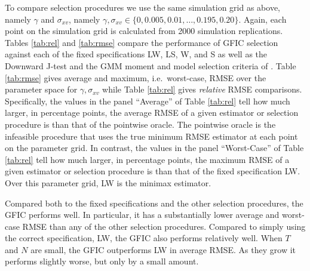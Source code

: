 To compare selection procedures we use the same simulation grid as above, namely $\gamma$ and $\sigma_{xv}$, namely $\gamma, \sigma_{xv} \in \{0, 0.005, 0.01, \hdots, 0.195, 0.20\}$.  
Again, each point on the simulation grid is calculated from 2000 simulation replications. 
Tables \ref{tab:rel} and \ref{tab:rmse} compare the performance of GFIC selection against each of the fixed specifications LW, LS, W, and S as well as the Downward J-test and the GMM moment and model selection criteria of \cite{AndrewsLu}. 
Table \ref{tab:rmse} gives average and maximum, i.e.\ worst-case, RMSE over the parameter space for $\gamma, \sigma_{xv}$ while Table \ref{tab:rel} gives \emph{relative} RMSE comparisons. Specifically, the values in the panel ``Average'' of Table \ref{tab:rel} tell how much larger, in percentage points, the average RMSE of a given estimator or selection procedure is than that of the pointwise oracle. 
The pointwise oracle is the infeasible procedure that uses the true minimum RMSE estimator at each point on the parameter grid. 
In contrast, the values in the panel ``Worst-Case'' of Table \ref{tab:rel} tell how much larger, in percentage points, the maximum RMSE of a given estimator or selection procedure is than that of the fixed specification LW. 
Over this parameter grid, LW is the minimax estimator.

Compared both to the fixed specifications and the other selection procedures, the GFIC performs well. 
In particular, it has a substantially lower average and worst-case RMSE than any of the other selection procedures.
Compared to simply using the correct specification, LW, the GFIC also performs relatively well. 
When $T$ and $N$ are small, the GFIC outperforms LW in average RMSE. 
As they grow it performs slightly worse, but only by a small amount.


